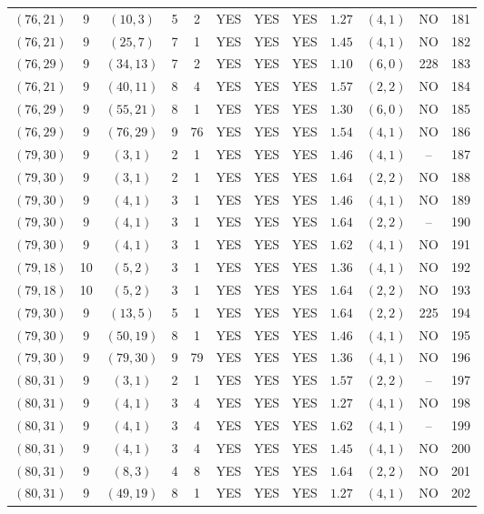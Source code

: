 \begin{longtable}{|c|c|c|c|c|c|c|c|c|c|c|c|}
$(76,21)$ & 9 & $(10,3)$ & 5 & 2 & YES & YES & YES & $1.27$ & $(4,1)$ & NO & 181\\
$(76,21)$ & 9 & $(25,7)$ & 7 & 1 & YES & YES & YES & $1.45$ & $(4,1)$ & NO & 182\\
$(76,29)$ & 9 & $(34,13)$ & 7 & 2 & YES & YES & YES & $1.10$ & $(6,0)$ & 228 & 183\\
$(76,21)$ & 9 & $(40,11)$ & 8 & 4 & YES & YES & YES & $1.57$ & $(2,2)$ & NO & 184\\
$(76,29)$ & 9 & $(55,21)$ & 8 & 1 & YES & YES & YES & $1.30$ & $(6,0)$ & NO & 185\\
$(76,29)$ & 9 & $(76,29)$ & 9 & 76 & YES & YES & YES & $1.54$ & $(4,1)$ & NO & 186\\
$(79,30)$ & 9 & $(3,1)$ & 2 & 1 & YES & YES & YES & $1.46$ & $(4,1)$ & -- & 187\\
$(79,30)$ & 9 & $(3,1)$ & 2 & 1 & YES & YES & YES & $1.64$ & $(2,2)$ & NO & 188\\
$(79,30)$ & 9 & $(4,1)$ & 3 & 1 & YES & YES & YES & $1.46$ & $(4,1)$ & NO & 189\\
$(79,30)$ & 9 & $(4,1)$ & 3 & 1 & YES & YES & YES & $1.64$ & $(2,2)$ & -- & 190\\
$(79,30)$ & 9 & $(4,1)$ & 3 & 1 & YES & YES & YES & $1.62$ & $(4,1)$ & NO & 191\\
$(79,18)$ & 10 & $(5,2)$ & 3 & 1 & YES & YES & YES & $1.36$ & $(4,1)$ & NO & 192\\
$(79,18)$ & 10 & $(5,2)$ & 3 & 1 & YES & YES & YES & $1.64$ & $(2,2)$ & NO & 193\\
$(79,30)$ & 9 & $(13,5)$ & 5 & 1 & YES & YES & YES & $1.64$ & $(2,2)$ & 225 & 194\\
$(79,30)$ & 9 & $(50,19)$ & 8 & 1 & YES & YES & YES & $1.46$ & $(4,1)$ & NO & 195\\
$(79,30)$ & 9 & $(79,30)$ & 9 & 79 & YES & YES & YES & $1.36$ & $(4,1)$ & NO & 196\\
$(80,31)$ & 9 & $(3,1)$ & 2 & 1 & YES & YES & YES & $1.57$ & $(2,2)$ & -- & 197\\
$(80,31)$ & 9 & $(4,1)$ & 3 & 4 & YES & YES & YES & $1.27$ & $(4,1)$ & NO & 198\\
$(80,31)$ & 9 & $(4,1)$ & 3 & 4 & YES & YES & YES & $1.62$ & $(4,1)$ & -- & 199\\
$(80,31)$ & 9 & $(4,1)$ & 3 & 4 & YES & YES & YES & $1.45$ & $(4,1)$ & NO & 200\\
$(80,31)$ & 9 & $(8,3)$ & 4 & 8 & YES & YES & YES & $1.64$ & $(2,2)$ & NO & 201\\
$(80,31)$ & 9 & $(49,19)$ & 8 & 1 & YES & YES & YES & $1.27$ & $(4,1)$ & NO & 202\\

\end{longtable}
